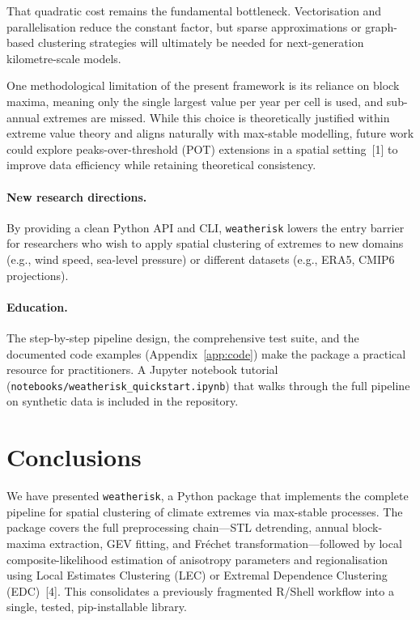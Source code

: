 \documentclass[preprint,12pt,a4paper]{elsarticle}
\newcommand{\revg}[1]{{#1}}
\newcommand{\revo}[1]{{#1}}
\newcommand{\revr}[1]{{#1}}
\begin{document}
\revg{That quadratic cost remains the fundamental bottleneck. Vectorisation and parallelisation reduce the constant factor, but sparse approximations or graph-based clustering strategies will ultimately be needed for next-generation kilometre-scale models.}

\revg{\revo{One methodological limitation of} the present framework is
its reliance on block maxima\revr{, meaning only the single largest value per year per cell is used, and sub-annual extremes are missed}.
While this choice is theoretically justified within extreme value
theory and aligns naturally with max-stable modelling, future work
could explore peaks-over-threshold (POT) extensions in a spatial
setting~[1] to improve data efficiency while retaining theoretical
consistency.}

\paragraph{New research directions.}
By providing a clean Python API and CLI, \texttt{weatherisk} lowers
the entry barrier for researchers who wish to apply spatial
clustering of extremes to new domains (e.g., wind speed, sea-level
pressure) or different datasets (e.g., ERA5, CMIP6 projections).

\paragraph{Education.}
The step-by-step pipeline design, the comprehensive test suite,
and the documented code examples (Appendix~\ref{app:code}) make
the package a practical resource for practitioners.  A Jupyter
notebook tutorial (\texttt{notebooks/weatherisk\_quickstart.ipynb})
that walks through the full pipeline on synthetic data is included
in the repository.

\section{Conclusions}
\label{sec:conclusions}

\revo{We have presented \texttt{weatherisk}, a Python package that
implements the complete pipeline for spatial clustering of climate
extremes via max-stable processes. The package covers the full
preprocessing chain---STL detrending, annual block-maxima extraction,
GEV fitting, and Fr\'{e}chet transformation---followed by local
composite-likelihood estimation of anisotropy parameters and
regionalisation using Local Estimates Clustering (LEC) or Extremal
Dependence Clustering (EDC)~[4]. This consolidates a previously
fragmented R/Shell workflow into a single, tested, pip-installable
library.}
\end{document}
